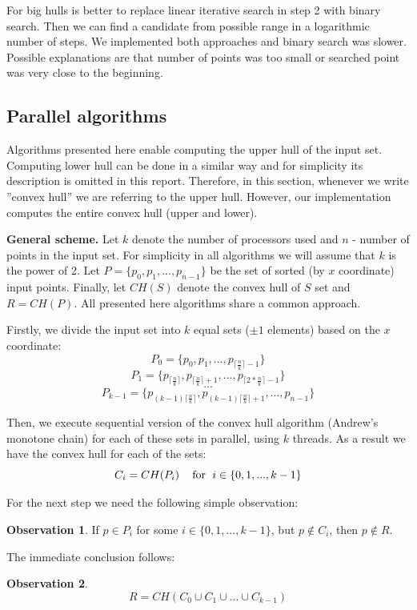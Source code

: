 \documentclass[letterpaper]{article}
\newcommand{\mypar}[1]{{\bf #1.}}
\theoremstyle{definition}
\newtheorem{observation}{Observation}
\begin{document}
For big hulls is better to replace linear iterative search in step 2 with binary search. Then we can find a candidate from possible range in a logarithmic number of steps.       
We implemented both approaches and binary search was slower. Possible explanations are that number of points was too small or searched point was very close to the beginning.

\subsection{Parallel algorithms}

Algorithms presented here enable computing the upper hull of the input set. 
Computing lower hull can be done in a similar way and for simplicity its description is omitted in this report. 
Therefore, in this section, whenever we write ''convex hull'' we are referring to the upper hull.
However, our implementation computes the entire convex hull (upper and lower).  

\mypar{General scheme}
Let $k$ denote the number of processors used and $n$ - number of points in the input set.
For simplicity in all algorithms we will assume that $k$ is the power of 2. 
Let $P = \{p_0, p_1, ..., p_{n-1} \}$ be the set of sorted (by $x$ coordinate) input points.
Finally, let $CH(S)$ denote the convex hull of $S$ set and $R=CH(P)$.
All presented here algorithms share a common approach.

Firstly, we divide the input set into $k$ equal sets ($\pm 1$ elements) based on the $x$ coordinate:
$$P_0 = \{p_0, p_1, ..., p_{\lceil{\frac{n}{k}}\rceil - 1}\}$$
$$P_1 = \{p_{\lceil{\frac{n}{k}}\rceil}, p_{\lceil{\frac{n}{k}}\rceil + 1}, ..., p_{\lceil{2 * \frac{n}{k}}\rceil - 1}\}$$
$$...$$
$$P_{k-1} = \{p_{(k-1)\lceil{\frac{n}{k}}\rceil}, p_{(k-1)\lceil{\frac{n}{k}}\rceil + 1}, ..., p_{n- 1} \}$$


Then, we execute sequential version of the convex hull algorithm (Andrew's monotone chain) for each of these sets in parallel, using $k$ threads.
As a result we have the convex hull for each of the sets:
$$C_i = CH(P_i) \textrm{\;\;\; for \;} i \in \{0, 1, ..., k - 1\}$$

For the next step we need the following simple observation:
\begin{observation}
If $p \in P_i$ for some $i \in \{0, 1, ..., k - 1\}$, but $p \notin C_i$, then $p \notin R$.
\end{observation}

The immediate conclusion follows:
\begin{observation}
$$R = CH(C_0 \cup C_1 \cup ... \cup C_{k - 1})$$
\end{observation}
\end{document}
